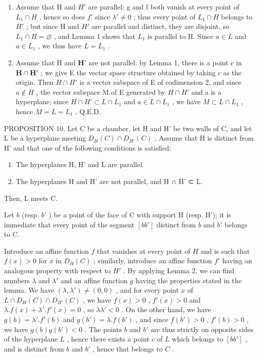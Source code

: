 \begin{enumerate}
\def\labelenumi{\alph{enumi})}
\item
  Assume that H and \(H'\) are parallel: g and f both vanish at every point of \(L_{1} \cap H\) , hence so does \(f'\) since \(\lambda' \neq 0\) ; thus every point of \(L_{1} \cap H\) belongs to \(H'\) ; but since H and \(H'\) are parallel and distinct, they are disjoint, so \(L_{1} \cap H = \varnothing\) , and Lemma 1 shows that \(L_{1}\) is parallel to H. Since \(a \in L\) and \(a \in L_{1}\) , we thus have \(L = L_{1}\) .
\item
  Assume that H and \(\mathbf{H}'\) are not parallel: by Lemma 1, there is a point \(c\) in \(\mathbf{H} \cap \mathbf{H}'\) ; we give E the vector space structure obtained by taking \(c\) as the origin. Then \(H \cap H'\) is a vector subspace of E of codimension 2, and since \(a \notin H\) , the vector subspace M of E generated by \(H \cap H'\) and a is a hyperplane; since \(H \cap H' \subset L \cap L_1\) and \(a \in L \cap L_1\) , we have \(M \subset L \cap L_1\) , hence \(M = L = L_1\) . Q.E.D.
\end{enumerate}

PROPOSITION 10. Let C be a chamber, let H and H' be two walls of C, and let L be a hyperplane meeting \(D_{H}(C) \cap D_{H'}(C)\) . Assume that H is distinct from H' and that one of the following conditions is satisfied:

\begin{enumerate}
\def\labelenumi{\alph{enumi})}
\item
  The hyperplanes H, H' and L are parallel.
\item
  The hyperplanes H and H' are not parallel, and H ∩ H' ⊂ L.
\end{enumerate}

Then, L meets C.

Let \(b\) (resp. \(b'\) ) be a point of the face of C with support H (resp. H'); it is immediate that every point of the segment \([bb']\) distinct from \(b\) and \(b'\) belongs to C.

Introduce an affine function \(f\) that vanishes at every point of \(H\) and is such that \(f(x) > 0\) for \(x\) in \(D_H(C)\) ; similarly, introduce an affine function \(f'\) having an analogous property with respect to \(H'\) . By applying Lemma 2, we can find numbers \(\lambda\) and \(\lambda'\) and an affine function \(g\) having the properties stated in the lemma. We have \((\lambda, \lambda') \neq (0, 0)\) , and for every point \(x\) of \(L \cap D_H(C) \cap D_{H'}(C)\) , we have \(f(x) > 0\) , \(f'(x) > 0\) and \(\lambda.f(x) + \lambda'.f'(x) = 0\) , so \(\lambda\lambda' < 0\) . On the other hand, we have \(g(b) = \lambda'.f'(b)\) and \(g(b') = \lambda.f(b')\) , and since \(f(b') > 0\) , \(f'(b) > 0\) , we have \(g(b)g(b') < 0\) . The points \(b\) and \(b'\) are thus strictly on opposite sides of the hyperplane \(L\) , hence there exists a point \(c\) of \(L\) which belongs to \([bb']\) , and is distinct from \(b\) and \(b'\) , hence that belongs to \(C\) .

